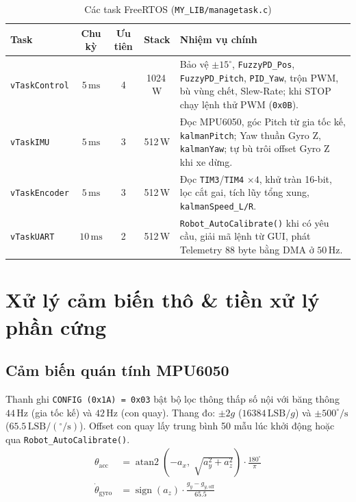 \documentclass[10pt,a4paper]{article}
\begin{document}
\begin{table}[htbp]
\centering
\caption{Các task FreeRTOS (\texttt{MY\_LIB/managetask.c})}
\footnotesize
\begin{tabular}{l c c c p{8.6cm}}
\toprule
\textbf{Task} & \textbf{Chu kỳ} & \textbf{Ưu tiên} & \textbf{Stack} & \textbf{Nhiệm vụ chính} \\
\midrule
\texttt{vTaskControl} & $5\,\text{ms}$ & 4 & 1024\,W & Bảo vệ $\pm 15^\circ$, \texttt{FuzzyPD\_Pos}, \texttt{FuzzyPD\_Pitch}, \texttt{PID\_Yaw}, trộn PWM, bù vùng chết, Slew-Rate; khi STOP chạy lệnh thử PWM (\texttt{0x0B}). \\
\texttt{vTaskIMU} & $5\,\text{ms}$ & 3 & 512\,W & Đọc MPU6050, góc Pitch từ gia tốc kế, \texttt{kalmanPitch}; Yaw thuần Gyro Z, \texttt{kalmanYaw}; tự bù trôi offset Gyro Z khi xe dừng. \\
\texttt{vTaskEncoder} & $5\,\text{ms}$ & 3 & 512\,W & Đọc \texttt{TIM3}/\texttt{TIM4} $\times 4$, khử tràn 16-bit, lọc cắt gai, tích lũy tổng xung, \texttt{kalmanSpeed\_L/R}. \\
\texttt{vTaskUART} & $10\,\text{ms}$ & 2 & 512\,W & \texttt{Robot\_AutoCalibrate()} khi có yêu cầu, giải mã lệnh từ GUI, phát Telemetry 88 byte bằng DMA ở $50\,\text{Hz}$. \\
\bottomrule
\end{tabular}
\end{table}

\section{Xử lý cảm biến thô \& tiền xử lý phần cứng}
\subsection{Cảm biến quán tính MPU6050}
Thanh ghi \texttt{CONFIG (0x1A) = 0x03} bật bộ lọc thông thấp số nội với băng thông $44\,\text{Hz}$ (gia tốc kế) và $42\,\text{Hz}$ (con quay). Thang đo: $\pm 2g$ ($16384\,\text{LSB}/g$) và $\pm 500^\circ/\text{s}$ ($65.5\,\text{LSB}/(^\circ/\text{s})$). Offset con quay lấy trung bình 50 mẫu lúc khởi động hoặc qua \texttt{Robot\_AutoCalibrate()}.
\begin{align}
\theta_{\text{acc}} &= \operatorname{atan2}\!\left(-a_x,\; \sqrt{a_y^2 + a_z^2}\right) \cdot \frac{180^\circ}{\pi} \\
\dot{\theta}_{\text{gyro}} &= \operatorname{sign}(a_z) \cdot \frac{g_y - g_{y,\text{off}}}{65.5}
\end{align}
\end{document}
